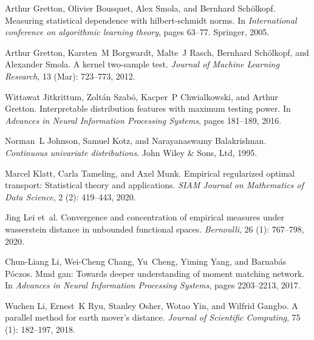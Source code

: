 \documentclass{article}
\theoremstyle{definition}
\begin{document}
\begin{thebibliography}{53}
Arthur Gretton, Olivier Bousquet, Alex Smola, and Bernhard Sch{\"o}lkopf.
\newblock Measuring statistical dependence with hilbert-schmidt norms.
\newblock In \emph{International conference on algorithmic learning theory},
  pages 63--77. Springer, 2005.

Arthur Gretton, Karsten~M Borgwardt, Malte~J Rasch, Bernhard Sch{\"o}lkopf, and
  Alexander Smola.
\newblock A kernel two-sample test.
\newblock \emph{Journal of Machine Learning Research}, 13
  (Mar): 723--773, 2012.

Wittawat Jitkrittum, Zolt{\'a}n Szab{\'o}, Kacper~P Chwialkowski, and Arthur
  Gretton.
\newblock Interpretable distribution features with maximum testing power.
\newblock In \emph{Advances in Neural Information Processing Systems}, pages
  181--189, 2016.

Norman~L Johnson, Samuel Kotz, and Narayanaswamy Balakrishnan.
\newblock \emph{Continuous univariate distributions}.
\newblock John Wiley \& Sons, Ltd, 1995.

Marcel Klatt, Carla Tameling, and Axel Munk.
\newblock Empirical regularized optimal transport: Statistical theory and
  applications.
\newblock \emph{SIAM Journal on Mathematics of Data Science}, 2
  (2): 419--443, 2020.

Jing Lei et~al.
\newblock Convergence and concentration of empirical measures under wasserstein
  distance in unbounded functional spaces.
\newblock \emph{Bernoulli}, 26 (1): 767--798, 2020.

Chun-Liang Li, Wei-Cheng Chang, Yu~Cheng, Yiming Yang, and Barnab{\'a}s
  P{\'o}czos.
\newblock Mmd gan: Towards deeper understanding of moment matching network.
\newblock In \emph{Advances in Neural Information Processing Systems}, pages
  2203--2213, 2017.

Wuchen Li, Ernest~K Ryu, Stanley Osher, Wotao Yin, and Wilfrid Gangbo.
\newblock A parallel method for earth mover's distance.
\newblock \emph{Journal of Scientific Computing}, 75 (1):
  182--197, 2018.


\end{thebibliography}
\end{document}
